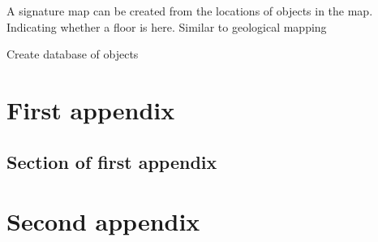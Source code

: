 \documentclass{mproj}
\begin{document}
A signature map can be created from the locations of objects in the map. Indicating whether a floor is here. Similar to geological mapping

Create database of objects


\appendix %
\chapter{First appendix}

\section{Section of first appendix}

\chapter{Second appendix}



\end{document}

